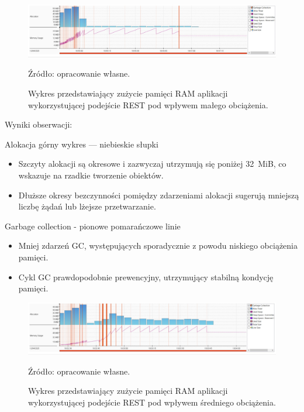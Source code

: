 \documentclass[runningheads,12pt]{llncs}
\begin{document}
\newpage


\begin{figure}
    \includegraphics[width=\linewidth]{images/rest-memory-low-graph.jpg}
    \caption{Wykres przedstawiający zużycie pamięci RAM aplikacji wykorzystującej podejście REST pod wpływem małego obciążenia.} \label{fig1}
    \vspace{0.5em}
    {\small Źródło: opracowanie własne.}
\end{figure}

Wyniki obserwacji:

Alokacja górny wykres — niebieskie słupki

\begin{itemize}
  \item Szczyty alokacji są okresowe i zazwyczaj utrzymują się poniżej 32~MiB, co wskazuje na rzadkie tworzenie obiektów.
  \item Dłuższe okresy bezczynności pomiędzy zdarzeniami alokacji sugerują mniejszą liczbę żądań lub lżejsze przetwarzanie.
\end{itemize}

Garbage collection - pionowe pomarańczowe linie

\begin{itemize}
  \item Mniej zdarzeń GC, występujących sporadycznie z powodu niskiego obciążenia pamięci.
  \item Cykl GC prawdopodobnie prewencyjny, utrzymujący stabilną kondycję pamięci.
\end{itemize}

\newpage

\begin{figure}
    \includegraphics[width=\linewidth]{images/rest-memory-middle-graph.jpg}
    \caption{Wykres przedstawiający zużycie pamięci RAM aplikacji wykorzystującej podejście REST pod wpływem średniego obciążenia.} \label{fig1}
    \vspace{0.5em}
    {\small Źródło: opracowanie własne.}
\end{figure}
\end{document}
